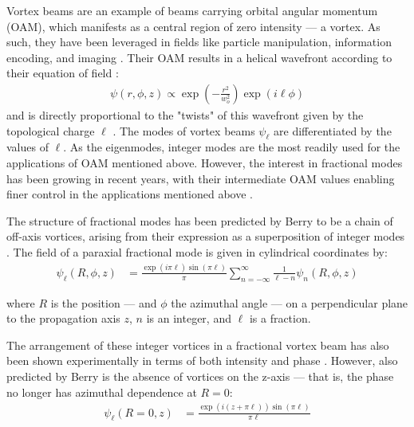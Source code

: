 \documentclass[10pt,a4paper,twoside]{article}
\renewcommand{\P}[1]{\left( #1 \right)}
\renewcommand{\l}{\ell}
\begin{document}
Vortex beams are an example of beams carrying orbital angular momentum (OAM), which manifests as a central region of zero intensity --- a vortex. As such, they have been leveraged in fields like particle manipulation, information encoding, and imaging \cite{rev-trap}. 
Their OAM results in a helical wavefront according to their equation of field \cite{rev}:
\begin{align}
    \psi(r,\phi, z) \propto \exp\P{-\frac{r^2}{w_o^2}} \exp(i\ell\phi)
\end{align}
and is directly proportional to the "twists" of this wavefront given by the topological charge $\ell$ \cite{alperin, twisted}.
The modes of vortex beams $\psi_\ell$ are differentiated by the values of $\ell$. As the eigenmodes, integer modes are the most readily used for the applications of OAM mentioned above. However, the interest in fractional modes has been growing in recent years, with their intermediate OAM values enabling finer control in the applications mentioned above \cite{rev}.

The structure of fractional modes has been predicted by Berry to be a chain of off-axis vortices, arising from their expression as a superposition of integer modes \cite{Berry}. The field of a paraxial fractional mode is given in cylindrical coordinates by:
 \begin{align}
  \psi_\ell (R, \phi, z) &= \frac{\exp\P{i\pi \ell} \sin\P{\pi \ell}}{\pi}
  \sum_{n=-\infty}^{\infty} \frac{1}{\ell - n} \psi_n (R, \phi, z)
\end{align}\label{eq:parax}

\noindent where $R$ is the position --- and $\phi$ the azimuthal angle --- on a perpendicular plane to the propagation axis $z$, $n$ is an integer, and $\ell$ is a fraction.

The arrangement of these integer vortices in a fractional vortex beam has also been shown experimentally in terms of both intensity and phase \cite{exp-struc, fiber-struc}. However, also predicted by Berry is the absence of vortices on the z-axis \cite{Berry} --- that is, the phase no longer has azimuthal dependence at $R=0$:
\begin{align}
     \psi_\ell (R=0, z) &= \frac{\exp\P{i(z + \pi \ell)} \sin\P{\pi \ell}}{\pi \ell}
\end{align}\label{eq:vortz}
\end{document}
